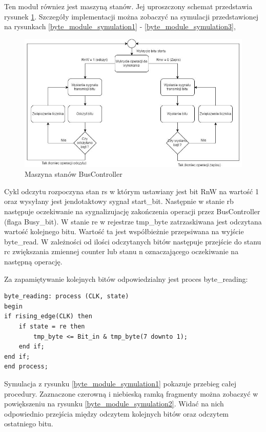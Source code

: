 \documentclass[a4paper]{article}
\begin{document}
Ten moduł równiez jest maszyną stanów. Jej uproszczony schemat przedstawia rysunek \ref{byte_module_fsm}. Szczegóły implementacji można zobaczyć na symulacji przedstawionej na rysunkach \ref{byte_module_symulation1} - \ref{byte_module_symulation3}, 

\begin{figure}[H]
\begin{center}
\includegraphics[width=15cm]{graphics/byte_module_fsm.png}
\end{center}
\caption{Maszyna stanów BusController}
\label{byte_module_fsm}
\end{figure}

Cykl odczytu rozpoczyna stan rs w którym ustawiany jest bit RnW na wartość 1 oraz wysyłany jest jendotaktowy sygnał start\_bit. Następnie w stanie rb następuje oczekiwanie na sygnalizujację zakończenia operacji przez BusController (flaga Busy\_bit). W stanie re w rejestrze tmp\_byte zatrzaskiwana jest odczytana wartość kolejnego bitu. Wartość ta jest współbieżnie przepsiwana na wyjście byte\_read. W zależności od ilości odczytanych bitów następuje przejście do stanu rc zwiększania zmiennej counter lub stanu n oznaczającego oczekiwanie na następną operację. 

Za zapamiętywanie kolejnych bitów odpowiedzialny jest proces byte\_reading:

\lstset{language=VHDL}
\begin{lstlisting}[frame=single]
byte_reading: process (CLK, state)
begin
if rising_edge(CLK) then
	if state = re then
		tmp_byte <= Bit_in & tmp_byte(7 downto 1);
	end if;
end if;
end process;
\end{lstlisting}

Symulacja z rysunku \ref{byte_module_symulation1} pokazuje przebieg całej procedury. Zaznaczone czerowną i niebieską ramką fragmenty można zobaczyć w powiększeniu na rysunku \ref{byte_module_symulation2}. Widać na nich odpowiednio przejścia między odczytem kolejnych bitów oraz odczytem ostatniego bitu.
\end{document}
